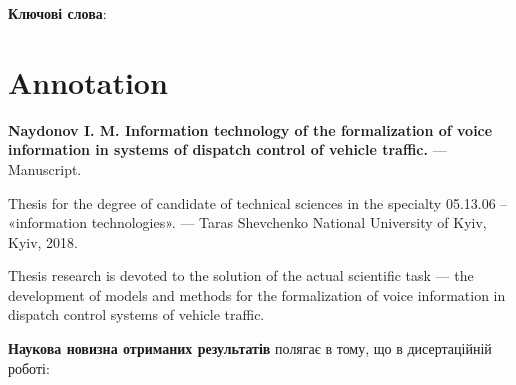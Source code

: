 \textbf{Ключові слова}: \keywords

\chapter*{Annotation}

\textbf{Naydonov I. M. Information technology of the formalization of voice information in systems of dispatch control of vehicle traffic.} --- Manuscript.

Thesis for the degree of candidate of technical sciences in the specialty 05.13.06 -- «information technologies». --- Taras Shevchenko National University of Kyiv, Kyiv, 2018.

Thesis research is devoted to the solution of the actual scientific task --- the development of models and methods for the formalization of voice information in dispatch control systems of vehicle traffic.

%
\textbf{Наукова новизна отриманих результатів} полягає в тому, що в дисертаційній роботі:


